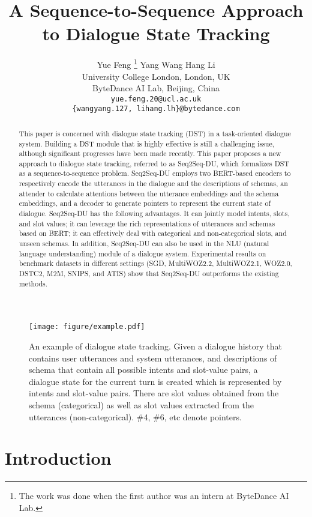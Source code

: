 \documentclass[11pt]{article}
\title{A Sequence-to-Sequence Approach to Dialogue State Tracking}
\author{Yue Feng \thanks{The work was done when the first author was an intern at ByteDance AI Lab.} \quad Yang Wang \quad Hang Li\\
  University College London, London, UK\\
  ByteDance AI Lab, Beijing, China\\
   {\texttt{yue.feng.20@ucl.ac.uk}} \\
  \texttt{\{wangyang.127, lihang.lh\}@bytedance.com} \\}
\date{}
\begin{document}
\maketitle
\begin{abstract}

This paper is concerned with dialogue state tracking (DST) in a task-oriented dialogue system. Building a DST module that is highly effective is still a challenging issue, although significant progresses have been made recently. This paper proposes a new approach to dialogue state tracking, referred to as Seq2Seq-DU, which formalizes DST as a sequence-to-sequence problem. Seq2Seq-DU employs two BERT-based encoders to respectively encode the utterances in the dialogue and the descriptions of schemas, an attender to calculate attentions between the utterance embeddings and the schema embeddings, and a decoder to generate pointers to represent the current state of dialogue. Seq2Seq-DU has the following advantages. It can jointly model intents, slots, and slot values; it can leverage the rich representations of utterances and schemas based on BERT; it can effectively deal with categorical and non-categorical slots, and unseen schemas. In addition, Seq2Seq-DU can also be used in the NLU (natural language understanding) module of a dialogue system. Experimental results on benchmark datasets in different settings (SGD, MultiWOZ2.2, MultiWOZ2.1, WOZ2.0, DSTC2, M2M, SNIPS, and ATIS) show that Seq2Seq-DU outperforms the existing methods.
\end{abstract}


\begin{figure}[!t]
\centering
\texttt{[image: figure/example.pdf]}
\caption{An example of dialogue state tracking. Given a dialogue history that contains user utterances and system utterances, and descriptions of schema that contain all possible intents and slot-value pairs, a dialogue state for the current turn is created which is represented by intents and slot-value pairs. There are slot values obtained from the schema (categorical) as well as slot values extracted from the utterances (non-categorical). \#4, \#6, etc denote pointers.}
\label{fig:example}
\end{figure}


\section{Introduction}
\end{document}
